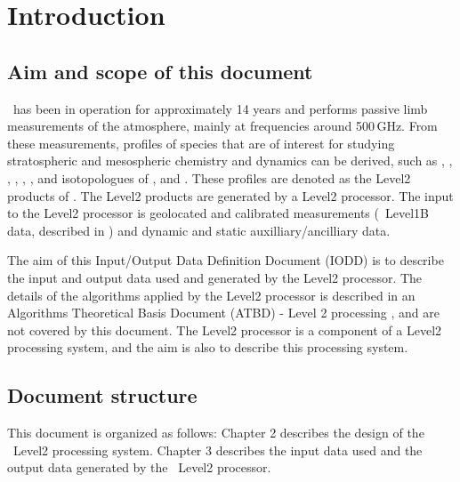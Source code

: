 \chapter{Introduction}
\label{chapter:introduction}


\setcounter{page}{1}


\section{Aim and scope of this document}
\label{sec:aim}

\smr\ has been in operation for approximately 14 years and performs passive
limb measurements of the atmosphere, mainly at frequencies around 500\,GHz.
From these measurements, profiles of species that are of interest for studying
stratospheric and mesospheric chemistry and dynamics can be derived, such as
, , , , ,
, and isotopologues of , and . These profiles
are denoted as the Level2 products of \smr. The Level2 products are generated
by a Level2 processor. The input to the Level2 processor is geolocated and
calibrated measurements (\smr\ Level1B data, described in \citet{atbdl1b}) and
dynamic and static auxilliary/ancilliary data.

The aim of this Input/Output Data Definition Document (IODD) is to describe
the input and output data used and generated by the Level2 processor.
The details of the algorithms applied by the Level2 processor
is described in an Algorithms Theoretical Basis Document (ATBD) - 
Level 2 processing \citep{atbdl2}, and are not covered by this document.
The Level2 processor is a component of a Level2 processing system,
and the aim is also to describe this processing system.

\section{Document structure}

This document is organized as follows:
Chapter 2 describes the design of the \smr\ Level2 processing system. 
Chapter 3 describes the input data used and the output data generated 
by the \smr\ Level2 processor.


